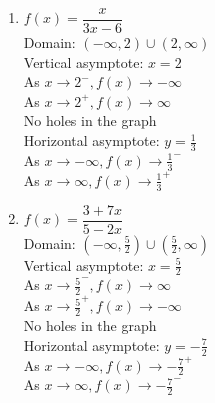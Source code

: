 \begin{multicols}{2}
\begin{enumerate} 

\item $f(x) = \dfrac{x}{3x - 6}$ \\ 
Domain: $(-\infty, 2) \cup (2, \infty)$\\
Vertical asymptote: $x = 2$\\
As $x \rightarrow 2^{-}, f(x) \rightarrow -\infty$\\
As $x \rightarrow 2^{+}, f(x) \rightarrow \infty$\\
No holes in the graph\\
Horizontal asymptote: $y = \frac{1}{3}$ \\
As $x \rightarrow -\infty, f(x) \rightarrow \frac{1}{3}^{-}$\\
As $x \rightarrow \infty, f(x) \rightarrow \frac{1}{3}^{+}$\\

\vfill

\columnbreak

\item $f(x) = \dfrac{3 + 7x}{5 - 2x}$\\
Domain: $(-\infty, \frac{5}{2}) \cup (\frac{5}{2}, \infty)$\\
Vertical asymptote: $x = \frac{5}{2}$\\
As $x \rightarrow \frac{5}{2}^{-}, f(x) \rightarrow \infty$\\
As $x \rightarrow \frac{5}{2}^{+}, f(x) \rightarrow -\infty$\\
No holes in the graph\\
Horizontal asymptote: $y = -\frac{7}{2}$ \\
As $x \rightarrow -\infty, f(x) \rightarrow -\frac{7}{2}^{+}$\\
As $x \rightarrow \infty, f(x) \rightarrow -\frac{7}{2}^{-}$\\

\setcounter{HW}{\value{enumi}}
\end{enumerate}
\end{multicols}

